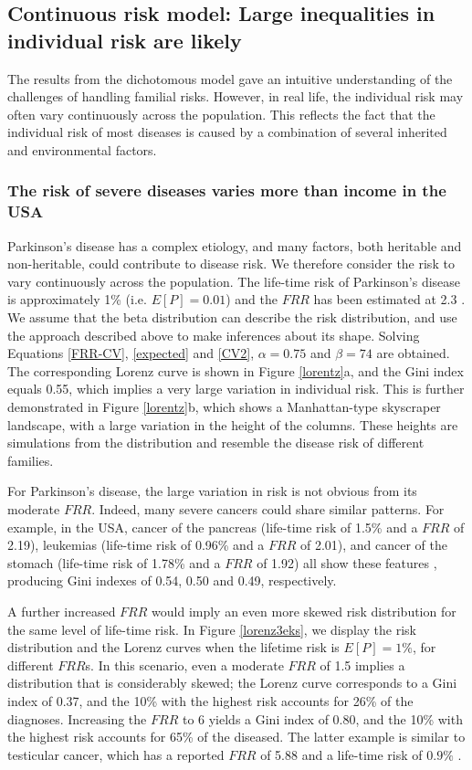 \documentclass{bmcart}
\begin{document}
\subsection*{Continuous risk model: Large inequalities in individual risk are likely}
\label{sec:2}
The results from the dichotomous model gave an intuitive understanding of the challenges of handling familial risks. However, in real life, the individual risk may often vary continuously across the population. This reflects the fact that the individual risk of most diseases is caused by a combination of several inherited and environmental factors.

\subsubsection*{The risk of severe diseases varies more than income in the USA}
Parkinson's disease has a complex etiology, and many factors, both heritable and non-heritable, could contribute to disease risk. We therefore consider the risk to vary continuously across the population. The life-time risk of Parkinson's disease is approximately 1\% (i.e. $E[P]=0.01$) and the $FRR$ has been estimated at 2.3 \cite{marder1996risk}. We assume that the beta distribution can describe the risk distribution, and use the approach described above to make inferences about its shape. Solving Equations \eqref{FRR-CV}, \eqref{expected} and \eqref{CV2}, $\alpha=0.75$ and $\beta=74$ are obtained. The corresponding Lorenz curve is shown in Figure \ref{lorentz}a, and the Gini index equals 0.55, which implies a very large variation in individual risk. This is further demonstrated in Figure \ref{lorentz}b, which shows a Manhattan-type skyscraper landscape, with a large variation in the height of the columns. These heights are simulations from the distribution and resemble the disease risk of different families. 

For Parkinson's disease, the large variation in risk is not obvious from its moderate $FRR$. Indeed, many severe cancers could share similar patterns. For example, in the USA, cancer of the pancreas (life-time risk of 1.5\% and a $FRR$ of 2.19), leukemias (life-time risk of 0.96\% and a $FRR$ of 2.01), and cancer of the stomach (life-time risk of 1.78\% and a $FRR$ of 1.92) all show these features \cite{howlader2011seer,frank2014population}, producing Gini indexes of 0.54, 0.50 and 0.49, respectively. 

A further increased $FRR$ would imply an even more skewed risk distribution for the same level of life-time risk. In Figure \ref{lorenz3eks}, we display the risk distribution and the Lorenz curves when the lifetime risk is $E[P]=1\%$, for different $FRR$s. In this scenario, even a moderate $FRR$ of 1.5 implies a distribution that is considerably skewed; the Lorenz curve corresponds to a Gini index of 0.37, and the 10\% with the highest risk accounts for 26\% of the diagnoses. Increasing the $FRR$ to 6 yields a Gini index of 0.80, and the 10\% with the highest risk accounts for 65\% of the diseased. The latter example is similar to testicular cancer, which has a reported $FRR$ of 5.88 and a life-time risk of $0.9\%$ \cite{valberg2014hierarchical,CiN20015}.
\end{document}
